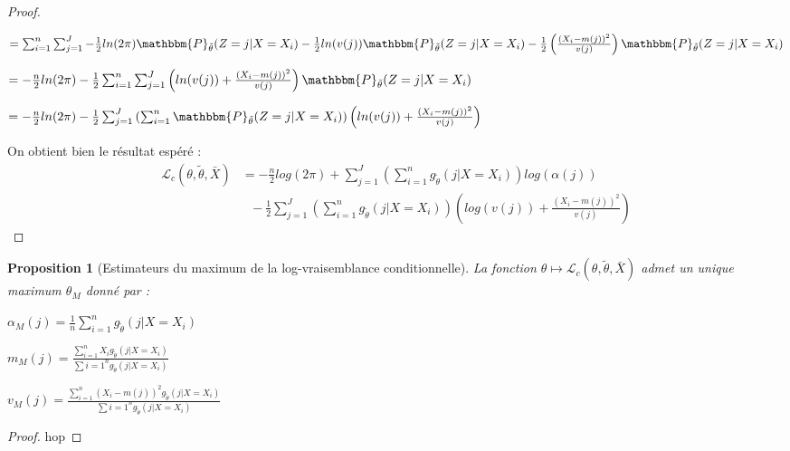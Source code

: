 \documentclass[frenchb]{report}
\newcommand{\1}{\mathbbm{1}}
\newcommand{\prob}{\mathbbm{P}}
\newcommand{\lv}{\mathcal{L}}
\newcommand{\thetat}{\tilde{\theta}}
\newtheorem{prop}{Proposition}
\theoremstyle{definition}\newtheorem{defn}{Définition}
\theoremstyle{definition}\newtheorem{exm}{Exemple}
\theoremstyle{definition}\newtheorem{nota}{Notation}
\theoremstyle{definition}\newtheorem{rem}{Remarque}
\begin{document}
\begin{proof}
\begin{center}
\end{center}
\begin{center}
$=\sum_{i=1}^n \sum_{j = 1}^J -\frac{1}{2} ln(2\pi) \prob_{\thetat} (Z = j|X = X_i)-\frac{1}{2}ln(v(j)) \prob_{\thetat} (Z = j|X = X_i) -\frac{1}{2}\left(\frac{(X_i - m(j))^2}{v(j)}\right)\prob_{\thetat} (Z = j|X = X_i) $
\end{center}
\begin{center}
$=-\frac{n}{2}ln(2\pi)  -\frac{1}{2} \sum_{i=1}^n \sum_{j = 1}^J \left(ln(v(j)) + \frac{(X_i - m(j))^2}{v(j)}\right)\prob_{\thetat} (Z = j|X = X_i) $
\end{center}
\begin{center}
$=-\frac{n}{2}ln(2\pi)  -\frac{1}{2} \sum_{j=1}^J \left( \sum_{i = 1}^n \prob_{\thetat} (Z = j|X = X_i) \right) \left(ln(v(j)) + \frac{(X_i - m(j))^2}{v(j)}\right) $
\end{center}
On obtient bien le résultat espéré :
\begin{align*}
 \lv_{c}(\theta, \thetat, \bar{X}) &= -\frac{n}{2}log(2\pi)+\sum_{j=1}^J \left(\sum_{i = 1}^n g_{\thetat} (j|X=X_i)\right) log(\alpha(j))\\
&~~~-\frac{1}{2}\sum_{j=1}^J\left(\sum_{i=1}^n g_{\thetat}(j|X=X_i)\right)\left(log(v(j))+\frac{(X_i-m(j))^2}{v(j)}\right)
\end{align*}
\end{proof}

\begin{prop}[Estimateurs du maximum de la log-vraisemblance conditionnelle] La fonction $\theta \mapsto \lv_{c}(\theta,\thetat,\bar{X})$ admet un unique maximum $\theta_M$ donné par : 
\begin{center}
$\alpha_M(j) = \frac{1}{n}\sum_{i=1}^n g_{\thetat}(j|X=X_i)$
\end{center}
\begin{center}

$m_M(j) = \frac{\sum_{i=1}^n X_i g_{\thetat}(j|X=X_i)}{\sum{i=1}^n g_{\thetat}(j|X=X_i)}$
\end{center}
\begin{center}

$v_M(j) = \frac{\sum_{i=1}^n (X_i -m(j))^2 g_{\thetat}(j|X=X_i)}{\sum{i=1}^n g_{\thetat}(j|X=X_i)}$
\end{center}

\end{prop}

\begin{proof}
hop
\end{proof}
\end{document}
